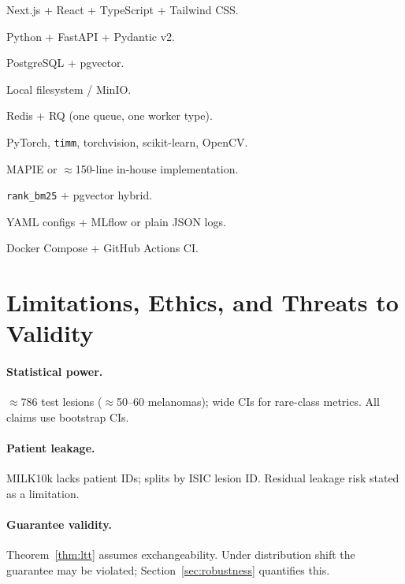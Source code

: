 \documentclass[conference]{IEEEtran}
\newcommand{\1}{\mathbf{1}}
\begin{document}
\begin{description}[leftmargin=8pt, style=nextline, itemsep=1pt]
  \item[\textbf{Frontend.}] Next.js + React + TypeScript + Tailwind CSS.
  \item[\textbf{Backend.}] Python + FastAPI + Pydantic v2.
  \item[\textbf{Database.}] PostgreSQL + pgvector.
  \item[\textbf{Object storage.}] Local filesystem / MinIO.
  \item[\textbf{Jobs.}] Redis + RQ (one queue, one worker type).
  \item[\textbf{ML.}] PyTorch, \texttt{timm}, torchvision, scikit-learn, OpenCV.
  \item[\textbf{Conformal/UQ.}] MAPIE or $\approx$150-line in-house implementation.
  \item[\textbf{Retrieval.}] \texttt{rank\_bm25} + pgvector hybrid.
  \item[\textbf{Experiments.}] YAML configs + MLflow or plain JSON logs.
  \item[\textbf{Deployment.}] Docker Compose + GitHub Actions CI.
\end{description}

\section{Limitations, Ethics, and Threats to Validity}
\label{sec:limitations}

\paragraph{Statistical power.}
$\approx$786 test lesions ($\approx$50--60 melanomas); wide CIs for
rare-class metrics. All claims use bootstrap CIs.

\paragraph{Patient leakage.}
MILK10k lacks patient IDs; splits by ISIC lesion ID. Residual leakage risk
stated as a limitation.

\paragraph{Guarantee validity.}
Theorem~\ref{thm:ltt} assumes exchangeability. Under distribution shift
the guarantee may be violated; Section~\ref{sec:robustness} quantifies this.
\end{document}
